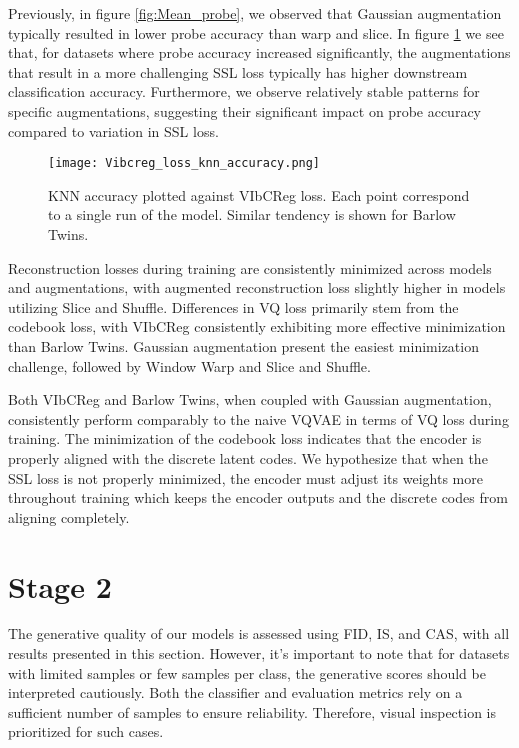 \documentclass[../../thesis.tex]{subfiles}
\begin{document}
Previously, in figure \ref{fig:Mean_probe}, we observed that Gaussian augmentation typically resulted in lower probe accuracy than warp and slice. In figure \ref{fig:Vibcreg_loss_knn_accuracy} we see that, for datasets where probe accuracy increased significantly, the augmentations that result in a more challenging SSL loss typically has higher downstream classification accuracy. Furthermore, we observe relatively stable patterns for specific augmentations, suggesting their significant impact on probe accuracy compared to variation in SSL loss.\newline

\begin{figure}[h]
    \texttt{[image: Vibcreg\_loss\_knn\_accuracy.png]}
    \centering  
    \caption{KNN accuracy plotted against VIbCReg loss. Each point correspond to a single run of the model. Similar tendency is shown for Barlow Twins.}
    \label{fig:Vibcreg_loss_knn_accuracy}
\end{figure}

Reconstruction losses during training are consistently minimized across models and augmentations, with augmented reconstruction loss slightly higher in models utilizing Slice and Shuffle. Differences in VQ loss primarily stem from the codebook loss, with VIbCReg consistently exhibiting more effective minimization than Barlow Twins. Gaussian augmentation present the easiest minimization challenge, followed by Window Warp and Slice and Shuffle.\newline

Both VIbCReg and Barlow Twins, when coupled with Gaussian augmentation, consistently perform comparably to the naive VQVAE in terms of VQ loss during training. The minimization of the codebook loss indicates that the encoder is properly aligned with the discrete latent codes. We hypothesize that when the SSL loss is not properly minimized, the encoder must adjust its weights more throughout training which keeps the encoder outputs and the discrete codes from aligning completely.

\section{Stage 2}
The generative quality of our models is assessed using FID, IS, and CAS, with all results presented in this section. However, it's important to note that for datasets with limited samples or few samples per class, the generative scores should be interpreted cautiously. Both the classifier and evaluation metrics rely on a sufficient number of samples to ensure reliability. Therefore, visual inspection is prioritized for such cases.
\end{document}
